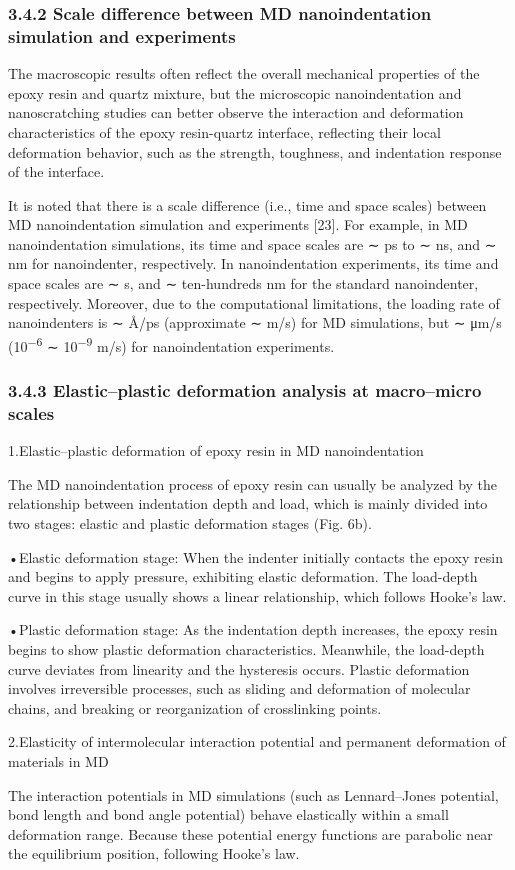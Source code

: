 \documentclass{article}
\begin{document}
\subsubsection*{3.4.2 Scale difference between MD nanoindentation simulation and experiments}

The macroscopic results often reflect the overall mechanical properties of the epoxy resin and quartz mixture, but the microscopic nanoindentation and nanoscratching studies can better observe the interaction and deformation characteristics of the epoxy resin-quartz interface, reflecting their local deformation behavior, such as the strength, toughness, and indentation response of the interface.

It is noted that there is a scale difference (i.e., time and space scales) between MD nanoindentation simulation and experiments [23]. For example, in MD nanoindentation simulations, its time and space scales are ∼ ps to ∼ ns, and ∼ nm for nanoindenter, respectively. In nanoindentation experiments, its time and space scales are ∼ s, and ∼ ten-hundreds nm for the standard nanoindenter, respectively. Moreover, due to the computational limitations, the loading rate of nanoindenters is ∼ Å/ps (approximate ∼ m/s) for MD simulations, but ∼ μm/s (10\textsuperscript{−6} ∼ 10\textsuperscript{−9} m/s) for nanoindentation experiments.

\subsubsection*{3.4.3 Elastic–plastic deformation analysis at macro–micro scales}

\begin{hangpars}
1.\quad Elastic–plastic deformation of epoxy resin in MD nanoindentation

The MD nanoindentation process of epoxy resin can usually be analyzed by the relationship between indentation depth and load, which is mainly divided into two stages: elastic and plastic deformation stages (Fig. 6b).

•\quad Elastic deformation stage: When the indenter initially contacts the epoxy resin and begins to apply pressure, exhibiting elastic deformation. The load-depth curve in this stage usually shows a linear relationship, which follows Hooke’s law.

•\quad Plastic deformation stage: As the indentation depth increases, the epoxy resin begins to show plastic deformation characteristics. Meanwhile, the load-depth curve deviates from linearity and the hysteresis occurs. Plastic deformation involves irreversible processes, such as sliding and deformation of molecular chains, and breaking or reorganization of crosslinking points.

2.\quad Elasticity of intermolecular interaction potential and permanent deformation of materials in MD

The interaction potentials in MD simulations (such as Lennard–Jones potential, bond length and bond angle potential) behave elastically within a small deformation range. Because these potential energy functions are parabolic near the equilibrium position, following Hooke’s law.
\end{hangpars}
\end{document}
